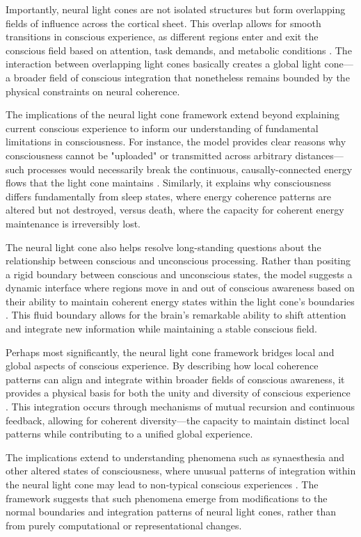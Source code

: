 Importantly, neural light cones are not isolated structures but form overlapping fields of influence across the cortical sheet. This overlap allows for smooth transitions in conscious experience, as different regions enter and exit the conscious field based on attention, task demands, and metabolic conditions \cite{petermann2009spontaneous}. The interaction between overlapping light cones basically creates a global light cone—a broader field of conscious integration that nonetheless remains bounded by the physical constraints on neural coherence.

The implications of the neural light cone framework extend beyond explaining current conscious experience to inform our understanding of fundamental limitations in consciousness. For instance, the model provides clear reasons why consciousness cannot be "uploaded" or transmitted across arbitrary distances—such processes would necessarily break the continuous, causally-connected energy flows that the light cone maintains \cite{seth2015granger}. Similarly, it explains why consciousness differs fundamentally from sleep states, where energy coherence patterns are altered but not destroyed, versus death, where the capacity for coherent energy maintenance is irreversibly lost.

The neural light cone also helps resolve long-standing questions about the relationship between conscious and unconscious processing. Rather than positing a rigid boundary between conscious and unconscious states, the model suggests a dynamic interface where regions move in and out of conscious awareness based on their ability to maintain coherent energy states within the light cone's boundaries \cite{tononi1998consciousness}. This fluid boundary allows for the brain's remarkable ability to shift attention and integrate new information while maintaining a stable conscious field.

Perhaps most significantly, the neural light cone framework bridges local and global aspects of conscious experience. By describing how local coherence patterns can align and integrate within broader fields of conscious awareness, it provides a physical basis for both the unity and diversity of conscious experience \cite{ramachandran2001synaesthesia}. This integration occurs through mechanisms of mutual recursion and continuous feedback, allowing for coherent diversity—the capacity to maintain distinct local patterns while contributing to a unified global experience.

The implications extend to understanding phenomena such as synaesthesia and other altered states of consciousness, where unusual patterns of integration within the neural light cone may lead to non-typical conscious experiences \cite{abraham1996metaplasticity}. The framework suggests that such phenomena emerge from modifications to the normal boundaries and integration patterns of neural light cones, rather than from purely computational or representational changes.

